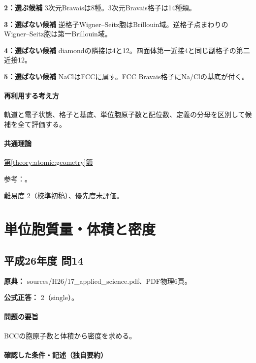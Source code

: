 \noindent\textbf{2：選ぶ候補} 3次元Bravaisは8種。3次元Bravais格子は14種類。\par

\noindent\textbf{3：選ばない候補} 逆格子Wigner–Seitz胞はBrillouin域。逆格子点まわりのWigner–Seitz胞は第一Brillouin域。\par

\noindent\textbf{4：選ばない候補} diamondの隣接は4と12。四面体第一近接4と同じ副格子の第二近接12。\par

\noindent\textbf{5：選ばない候補} NaClはFCCに属す。FCC Bravais格子にNa/Clの基底が付く。\par

\paragraph{再利用する考え方} 軌道と電子状態、格子と基底、単位胞原子数と配位数、定義の分母を区別して候補を全て評価する。

\paragraph{共通理論} \hyperref[theory:atomic:geometry]{第\ref*{theory:atomic:geometry}節}

\par 参考：\cite{atomic_bravais_ref,openstax_crystals}。

\par 難易度 2（校準初稿）、優先度未評価。

\section{単位胞質量・体積と密度}

\subsection{平成26年度 問14}
\label{q:h26-reg-applied-14}

\noindent\textbf{原典：} sources/H26/17\_applied\_science.pdf、PDF物理6頁。

\textbf{公式正答：} 2（single）。

\paragraph{問題の要旨} BCCの胞原子数と体積から密度を求める。

\paragraph{確認した条件・記述（独自要約）}\mbox{}\par


